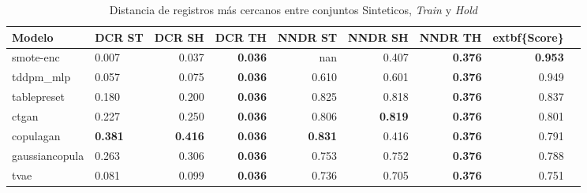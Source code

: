 \begin{table}[H]
\centering
\caption{Distancia de registros más cercanos entre conjuntos Sinteticos, \emph{Train} y \emph{Hold}}
\label{table-dcr-king county-a-2}
\begin{tabular}{|l|l|r|r|r|r|r|r|r|}
\hline
\rowcolor[gray]{0.8}
Modelo & DCR ST & DCR SH & DCR TH & NNDR ST & NNDR SH & NNDR TH & 	extbf\{Score\} \\
\hline smote-enc & \cellcolor{red} 0.007 & \cellcolor{red} 0.037 & \bfseries 0.036 & nan & 0.407 & \bfseries 0.376 & \bfseries 0.953 \\
\hline tddpm\_mlp & 0.057 & 0.075 & \bfseries 0.036 & 0.610 & 0.601 & \bfseries 0.376 & 0.949 \\
\hline tablepreset & 0.180 & 0.200 & \bfseries 0.036 & 0.825 & 0.818 & \bfseries 0.376 & 0.837 \\
\hline ctgan & 0.227 & 0.250 & \bfseries 0.036 & 0.806 & \bfseries 0.819 & \bfseries 0.376 & 0.801 \\
\hline copulagan & \bfseries 0.381 & \bfseries 0.416 & \bfseries 0.036 & \bfseries 0.831 & 0.416 & \bfseries 0.376 & 0.791 \\
\hline gaussiancopula & 0.263 & 0.306 & \bfseries 0.036 & 0.753 & 0.752 & \bfseries 0.376 & 0.788 \\
\hline tvae & 0.081 & 0.099 & \bfseries 0.036 & 0.736 & 0.705 & \bfseries 0.376 & 0.751 \\
\hline
\end{tabular}
\end{table}
